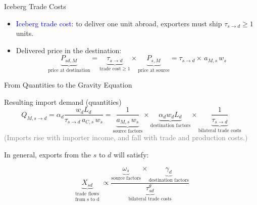 \documentclass[notes,11pt, aspectratio=169, xcolor=table]{beamer}
\newcommand{\blue}[1]{\textcolor{blue}{#1}}
\newenvironment{wideitemize}{\itemize\addtolength{\itemsep}{10pt}}{\enditemize}
\begin{document}
\begin{frame}{Iceberg Trade Costs}
\small
\begin{itemize}
    \item<1-> \blue{Iceberg trade cost}:
          to deliver one unit abroad, exporters must ship $\tau_{s\to d}\ge 1$ units.
    \item<2-> Delivered price in the destination:
          \[
          \underbrace{P_{sd,M}}_{\text{price at destination}} = \underbrace{\tau_{s\to d}}_{\text{trade cost} \ge1} \times \underbrace{P_{s,M}}_{\text{price at source}} = \tau_{s\to d} \times \, a_{M,s}\, w_s
          \]
\end{itemize}
\end{frame}


\begin{frame}{From Quantities to the Gravity Equation}
\small

\begin{wideitemize}
    \item Resulting import demand (quantities)
\[
Q_{M,s\to d} = 
\alpha_d \frac{w_d L_d}{\tau_{s\to d}\, a_{C,s}\, w_s} =  \underbrace{\frac{1}{ a_{M,s}\, w_s}}_{\text{source factors}} \times \underbrace{\alpha_d w_d L_d}_{\text{destination factors}} \times \underbrace{\frac{1}{\tau_{s\to d}}}_{\text{bilateral trade costs}}
\]
\textcolor{gray}{(Imports rise with importer income, and fall with trade and production costs.)}


\item<3-> In general, exports from the $s$ to $d$ will satisfy:  

\[
\underbrace{X_{sd}}_{\substack{\text{trade flows}\\ \text{from s to d} }} \propto \frac{\underbrace{\omega_{s}}_{\text{source factors}} \times \underbrace{\gamma_{d}}_{\text{destination factors}}}{\underbrace{\tau_{sd}^{\theta}}_{\text{bilateral trade costs}}} 
\]

\end{wideitemize}


\end{frame}
\end{document}
